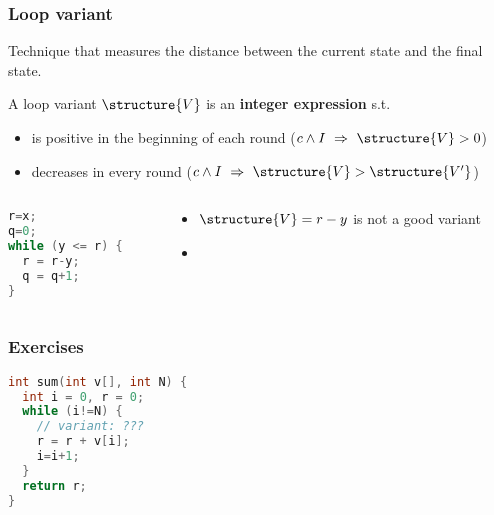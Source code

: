 \documentclass[aspectratio=169]{beamer}
\begin{document}
\begin{frame}[fragile]\frametitle{Loop variant}
  
  Technique that measures the distance between the current state and the final state.

  \begin{block}{A loop variant $\structure{V}$ is an \textbf{integer expression} s.t.}
    \begin{itemize}
      \item is positive in the beginning of each round ($c \land I ~\Rightarrow~ \structure{V}>0$)
      \item decreases in every round ($c \land I ~\Rightarrow~ \structure{V} > \structure{V'}$)
    \end{itemize}
  \end{block}

\begin{columns}
\begin{column}{0.48\textwidth}
\begin{lstlisting}[language=C++]
r=x;
q=0;
while (y <= r) {
  r = r-y;
  q = q+1;
}
\end{lstlisting}
\end{column}
\begin{column}{0.48\textwidth}
  \begin{itemize}
    \item $\structure{V} = r-y$ is not a good variant
    \item {}

  \end{itemize}
\end{column}
\end{columns}

\end{frame}

\begin{frame}[fragile]\frametitle{Exercises}

\begin{lstlisting}[language=C++]
int sum(int v[], int N) {
  int i = 0, r = 0;
  while (i!=N) {
    // variant: ???
    r = r + v[i];
    i=i+1;
  }
  return r;
}
\end{lstlisting}

~\\[-10mm]


\end{frame}
\end{document}
